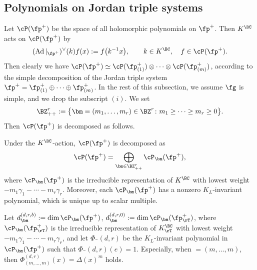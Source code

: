 \subsection{Polynomials on Jordan triple systems}
Let $\cP(\fp^+)$ be the space of all holomorphic polynomials on $\fp^+$. Then $K^\BC$ acts on $\cP(\fp^+)$ by
\begin{gather*} (\operatorname{Ad}|_{\fp^+})^\vee(k)f(x):=f\big(k^{-1}x\big), \qquad k\in K^\BC,\quad f\in\cP(\fp^+). \end{gather*}
Then clearly we have $\cP(\fp^+)\simeq \cP(\fp^+_{(1)})\otimes\cdots\otimes\cP(\fp^+_{(m)})$, according to the
simple decomposition of the Jordan triple system $\fp^+=\fp^+_{(1)}\oplus\cdots\oplus\fp^+_{(m)}$.
In the rest of this subsection, we assume $\fg$ is simple, and we drop the subscript $(i)$. We set
\begin{gather*} \BZ_{++}^r:=\big\{\bm=(m_1,\ldots,m_r)\in\BZ^r\colon m_1\ge \cdots \ge m_r\ge 0\big\}. \end{gather*}
Then $\cP(\fp^+)$ is decomposed as follows.
\begin{Theorem}\label{HKS}
Under the $K^\BC$-action, $\cP(\fp^+)$ is decomposed as
\begin{gather*} \cP(\fp^+)=\bigoplus_{\bm\in\BZ^{r}_{++}}\cP_\bm(\fp^+), \end{gather*}
where $\cP_\bm(\fp^+)$ is the irreducible representation of $K^\BC$ with lowest weight
$-m_1\gamma_1-\cdots-m_r\gamma_r$. Moreover, each $\cP_\bm(\fp^+)$ has a nonzero $K_L$-invariant polynomial,
which is unique up to scalar multiple.
\end{Theorem}
Let $d_\bm^{(d,r,b)}:=\dim\cP_\bm(\fp^+)$, $d_\bm^{(d,r,0)}:=\dim\cP_\bm(\fp^+_\rT)$,
where $\cP_\bm(\fp^+_\rT)$ is the irreducible representation of $K^\BC_\rT$ with lowest weight $-m_1\gamma_1-\cdots-m_r\gamma_r$,
and let $\Phi_\bm^{(d,r)}$ be the $K_L$-invariant polynomial in $\cP_\bm(\fp^+)$
such that $\Phi_\bm^{(d,r)}(e)=1$. Especially, when $\bm=(m,\ldots,m)$, then $\Phi_{(m,\ldots,m)}^{(d,r)}(x)=\Delta(x)^m$ holds.

